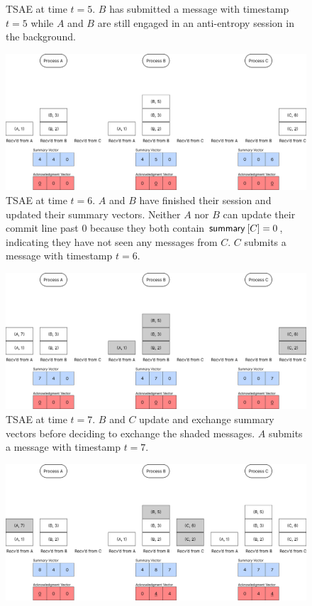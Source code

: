 \documentclass[]             %
{NASA}                       %
\theoremstyle{definition}
\begin{document}
\begin{landscape}
\begin{figure}[ht]
    \caption{TSAE at time $t=5$. $B$ has submitted a message with timestamp
      $t = 5$ while $A$ and $B$ are still engaged in an anti-entropy
      session in the background.}
    \label{fig:tsae3}
  \end{figure}
  \begin{figure}[ht]
    \centering
    \includegraphics[width=1.4\textwidth]{images/tsae/TSAE6.png}
    \caption{TSAE at time $t=6$. $A$ and $B$ have finished their session and updated their summary vectors. Neither $A$ nor $B$ can update their commit line past $0$ because they both contain $\mathsf{summary}^{}\left[C\right] = 0$, indicating they have not seen any messages from $C$. $C$ submits a message with timestamp $t = 6$.}
    \label{fig:tsae4}
  \end{figure}
  \begin{figure}[ht]
    \centering
    \includegraphics[width=1.4\textwidth]{images/tsae/TSAE7.png}
    \caption{TSAE at time $t=7$. $B$ and $C$ update and exchange summary vectors before deciding to exchange the shaded messages. $A$ submits a message with timestamp $t = 7$.}
    \label{fig:tsae5}
  \end{figure}
  \begin{figure}[ht]
    \centering
    \includegraphics[width=1.4\textwidth]{images/tsae/TSAE8.png}

\end{figure}
\end{landscape}
\end{document}
